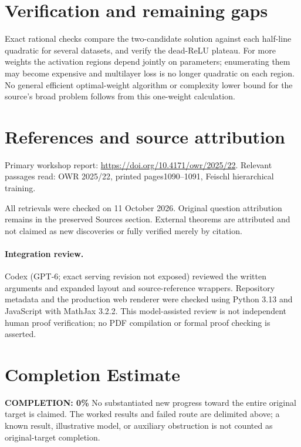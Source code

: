 \documentclass[11pt]{article}
\begin{document}
\section{Verification and remaining gaps}
Exact rational checks compare the two-candidate solution against each half-line quadratic for several datasets, and verify the dead-ReLU plateau. For more weights the activation regions depend jointly on parameters; enumerating them may become expensive and multilayer loss is no longer quadratic on each region. No general efficient optimal-weight algorithm or complexity lower bound for the source's broad problem follows from this one-weight calculation.

\section{References and source attribution}
Primary workshop report: \url{https://doi.org/10.4171/owr/2025/22}. Relevant passages read: OWR 2025/22, printed pages1090--1091, Feischl hierarchical training.

All retrievals were checked on 11 October 2026. Original question attribution remains in the preserved Sources section. External theorems are attributed and not claimed as new discoveries or fully verified merely by citation.


\paragraph{Integration review.} Codex (GPT-6; exact serving revision not exposed) reviewed the written arguments and expanded layout and source-reference wrappers. Repository metadata and the production web renderer were checked using Python 3.13 and JavaScript with MathJax 3.2.2. This model-assisted review is not independent human proof verification; no PDF compilation or formal proof checking is asserted.

\section{Completion Estimate}
\noindent\textbf{COMPLETION: 0\%}
No substantiated new progress toward the entire original target is claimed. The worked results and failed route are delimited above; a known result, illustrative model, or auxiliary obstruction is not counted as original-target completion.
\end{document}
